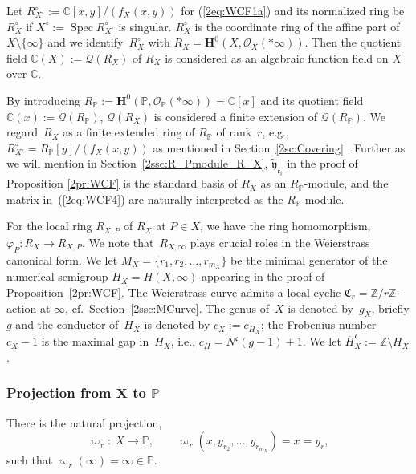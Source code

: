 \documentclass[pdftex]{sigma}
\def\CC{{\mathbb C}}
\def\ZZ{{\mathbb Z}}
\def\PP{{\mathbb P}}
\def\bH{{\mathbf F}}
\def\bH{{\mathbf H}}
\def\cO{{\mathcal O}}
\def\cQ{{\mathcal Q}}
\def\fC{{\mathfrak C}}
\def\fc{{\mathfrak c}}
\def\tfy{{\widetilde{\mathfrak y}}}
\def\Bfe{{\overline{\mathfrak e}}}
\def\lH{{\overline H}}
\def\Spec{\operatorname{Spec}}
\numberwithin{equation}{section}
\begin{document}
\begin{Remark}\label{2rm:g_Xc_X}
Let $R_{X^\circ}^\circ := \CC[x,y]/(f_X(x,y))$ for (\ref{2eq:WCF1a}) and its normalized ring be $R_X^\circ$ if $X^\circ:=\Spec R_{X^\circ}^\circ$ is singular.
$R_X^\circ$ is the coordinate ring of the affine part of $X\setminus\{\infty\}$ and we identify~$R_X^\circ$ with $R_X=\bH^0(X,\cO_X(*\infty))$.
Then the quotient field $\CC(X):=\cQ(R_X)$ of $R_X$ is considered as an algebraic function field on $X$ over $\CC$.

By introducing $R_\PP:=\bH^0(\PP, \cO_\PP(*\infty))=\CC[x]$ and its quotient field $\CC(x):=\cQ(R_\PP)$, $\cQ(R_X)$ is considered a finite extension of $\cQ(R_\PP)$.
We regard~$R_X$ as a finite extended ring of $R_\PP$ of rank~$r$, e.g., $R_{X^\circ}^\circ=R_\PP[y]/(f_X(x,y))$ as mentioned in Section~\ref{2sc:Covering} \cite{Kunz2004}.
Further as we will mention in Section~\ref{2ssc:R_Pmodule_R_X}, $\tfy_{\Bfe_{i}}$ in the proof of Proposition \ref{2pr:WCF} is the standard basis of $R_X$ as an $R_\PP$-module, and the matrix in~(\ref{2eq:WCF4}) are naturally interpreted as the $R_\PP$-module.

For the local ring $R_{X,P}$ of $R_X$ at $P \in X$, we have the ring homomorphism,
$\varphi_{P}\colon R_X\to R_{X,P}$.
We note that~$R_{X, \infty}$ plays crucial roles in the Weierstrass canonical form.
We let $M_X =\{ r_1, r_2, \dots, r_{m_X}\}$ be the minimal generator of the numerical semigroup $H_X=H(X, \infty)$ appearing in the proof of Proposition~\ref{2pr:WCF}.
The Weierstrass curve admits a local cyclic $\fC_r=\ZZ/r\ZZ$-action at $\infty$, cf.\ Section~\ref{2ssc:MCurve}.
The genus of~$X$ is denoted by~$g_X$, briefly $g$ and the conductor of~$H_X$ is denoted by $c_X:=c_{H_X}$; the Frobenius number $c_X-1$ is the maximal gap in~$H_X$, i.e., $c_H=N^\fc(g-1)+1$.
We let $\lH_X^\fc:=\ZZ\setminus H_X$.
\end{Remark}

\subsubsection[Projection from X to P]{Projection from $\boldsymbol{X}$ to $\boldsymbol{\PP}$}\label{2sssc:X_to_PP}

There is the natural projection,
\begin{equation*}
\varpi_{r}\colon \ X \to \PP, \qquad
\varpi_{r}(x,y_{r_2}, \dots, y_{r_{m_X}}) = x=y_r,%
\end{equation*}
such that $\varpi_{r}(\infty) = \infty\in \PP$.
\end{document}
